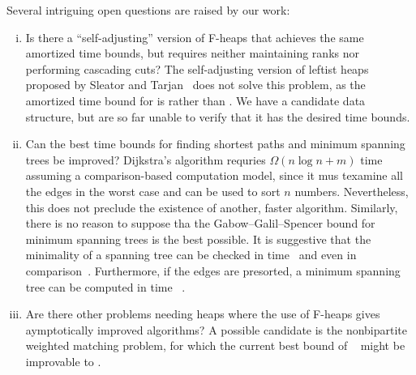 Several intriguing open questions are raised by our work:
\begin{enumerate}[(i)][3]
	\item Is there a ``self-adjusting'' version of F-heaps that achieves the same
		amortized time bounds, but requires neither maintaining ranks nor performing
		cascading cuts? The self-adjusting version of leftist heaps proposed by
		Sleator and Tarjan~\cite{SleatorTarjan1986} does not solve this problem, as
		the amortized time bound for  is  rather than
		. We have a candidate data structure, but are so far unable to verify
		that it has the desired time bounds.
	\item Can the best time bounds for finding shortest paths and minimum spanning
		trees be improved? Dijkstra's algorithm requries \(\Omega(n \log n + m)\)
		time assuming a comparison-based computation model, since it mus texamine all
		the edges in the worst case and can be used to sort \(n\) numbers.
		Nevertheless, this does not preclude the existence of another, faster
		algorithm. Similarly, there is no reason to suppose tha the
		Gabow--Galil--Spencer bound for minimum spanning trees is the best possible.
		It is suggestive that the minimality of a spanning tree can be checked in
		 time~\cite{Tarjan1979b} and even in 
		comparison~\cite{Komlos1984}. Furthermore, if the edges are presorted,
		a minimum spanning tree can be computed in  time~%
		\cite{Tarjan1983}.
	\item Are there other problems needing heaps where the use of F-heaps gives
		aymptotically improved algorithms? A possible candidate is the nonbipartite
		weighted matching problem, for which the current best bound of ~\cite{Gabow+1984} might be improvable
		to .
\end{enumerate}

